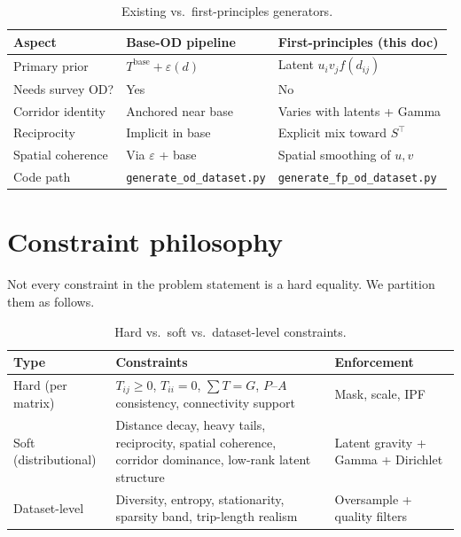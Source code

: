 \documentclass[11pt,a4paper]{report}
\begin{document}
\begin{table}[ht]
\centering
\caption{Existing vs.\ first-principles generators.}
\label{tab:fp-compare}
\small
\begin{tabular}{@{}p{3.2cm}p{5.2cm}p{5.2cm}@{}}
\toprule
\textbf{Aspect} & \textbf{Base-OD pipeline} & \textbf{First-principles (this doc)} \\
\midrule
Primary prior & $T^{\mathrm{base}}+\varepsilon(d)$ & Latent $u_i v_j f(d_{ij})$ \\
Needs survey OD? & Yes & No \\
Corridor identity & Anchored near base & Varies with latents + Gamma \\
Reciprocity & Implicit in base & Explicit mix toward $S^\top$ \\
Spatial coherence & Via $\varepsilon$ + base & Spatial smoothing of $u,v$ \\
Code path & \texttt{generate\_od\_dataset.py} & \texttt{generate\_fp\_od\_dataset.py} \\
\bottomrule
\end{tabular}
\end{table}

\section{Constraint philosophy}

Not every constraint in the problem statement is a hard equality. We partition them as follows.

\begin{table}[ht]
\centering
\caption{Hard vs.\ soft vs.\ dataset-level constraints.}
\label{tab:fp-constraint-types}
\small
\begin{tabular}{@{}p{2.8cm}p{5.4cm}p{5.4cm}@{}}
\toprule
\textbf{Type} & \textbf{Constraints} & \textbf{Enforcement} \\
\midrule
Hard (per matrix) &
$T_{ij}\ge 0$, $T_{ii}=0$, $\sum T=G$, $P$--$A$ consistency, connectivity support &
Mask, scale, IPF \\
Soft (distributional) &
Distance decay, heavy tails, reciprocity, spatial coherence, corridor dominance, low-rank latent structure &
Latent gravity + Gamma + Dirichlet \\
Dataset-level &
Diversity, entropy, stationarity, sparsity band, trip-length realism &
Oversample + quality filters \\
\bottomrule
\end{tabular}
\end{table}
\end{document}

